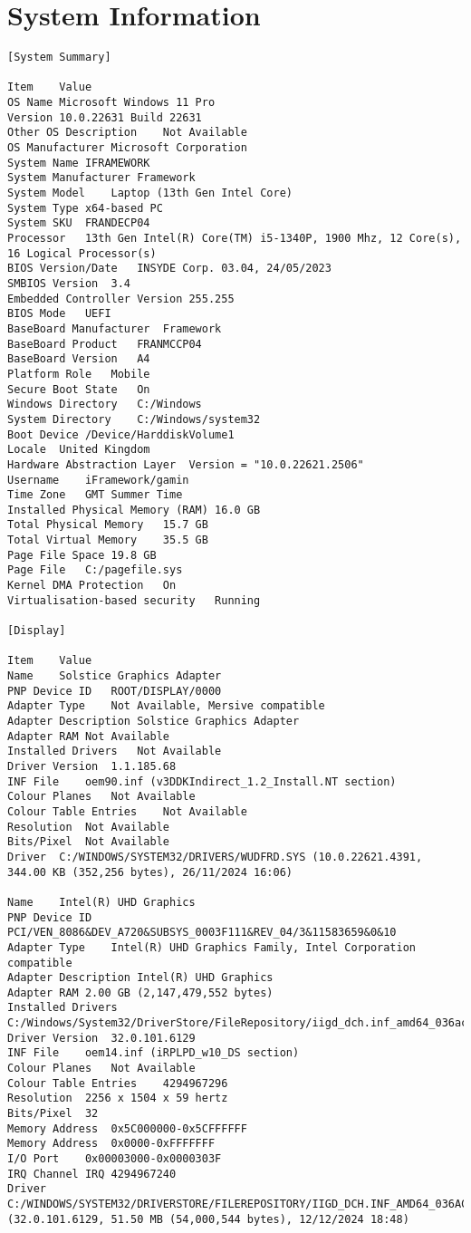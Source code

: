 \chapter{System Information}\label{app:sysinfo}
\begin{lstlisting}
[System Summary]

Item	Value	
OS Name	Microsoft Windows 11 Pro	
Version	10.0.22631 Build 22631	
Other OS Description 	Not Available	
OS Manufacturer	Microsoft Corporation	
System Name	IFRAMEWORK	
System Manufacturer	Framework	
System Model	Laptop (13th Gen Intel Core)	
System Type	x64-based PC	
System SKU	FRANDECP04	
Processor	13th Gen Intel(R) Core(TM) i5-1340P, 1900 Mhz, 12 Core(s), 16 Logical Processor(s)	
BIOS Version/Date	INSYDE Corp. 03.04, 24/05/2023	
SMBIOS Version	3.4	
Embedded Controller Version	255.255	
BIOS Mode	UEFI	
BaseBoard Manufacturer	Framework	
BaseBoard Product	FRANMCCP04	
BaseBoard Version	A4	
Platform Role	Mobile	
Secure Boot State	On	
Windows Directory	C:/Windows	
System Directory	C:/Windows/system32	
Boot Device	/Device/HarddiskVolume1	
Locale	United Kingdom	
Hardware Abstraction Layer	Version = "10.0.22621.2506"	
Username	iFramework/gamin	
Time Zone	GMT Summer Time	
Installed Physical Memory (RAM)	16.0 GB	
Total Physical Memory	15.7 GB	
Total Virtual Memory	35.5 GB	
Page File Space	19.8 GB	
Page File	C:/pagefile.sys	
Kernel DMA Protection	On	
Virtualisation-based security	Running	

[Display]

Item	Value	
Name	Solstice Graphics Adapter	
PNP Device ID	ROOT/DISPLAY/0000	
Adapter Type	Not Available, Mersive compatible	
Adapter Description	Solstice Graphics Adapter	
Adapter RAM	Not Available	
Installed Drivers	Not Available	
Driver Version	1.1.185.68	
INF File	oem90.inf (v3DDKIndirect_1.2_Install.NT section)	
Colour Planes	Not Available	
Colour Table Entries	Not Available	
Resolution	Not Available	
Bits/Pixel	Not Available	
Driver	C:/WINDOWS/SYSTEM32/DRIVERS/WUDFRD.SYS (10.0.22621.4391, 344.00 KB (352,256 bytes), 26/11/2024 16:06)	
		
Name	Intel(R) UHD Graphics	
PNP Device ID	PCI/VEN_8086&DEV_A720&SUBSYS_0003F111&REV_04/3&11583659&0&10	
Adapter Type	Intel(R) UHD Graphics Family, Intel Corporation compatible	
Adapter Description	Intel(R) UHD Graphics	
Adapter RAM	2.00 GB (2,147,479,552 bytes)	
Installed Drivers	C:/Windows/System32/DriverStore/FileRepository/iigd_dch.inf_amd64_036aca5c7729dd8d/igdumdim64.dll,C:/Windows/System32/DriverStore/FileRepository/iigd_dch.inf_amd64_036aca5c7729dd8d/igd10iumd64.dll,C:/Windows/System32/DriverStore/FileRepository/iigd_dch.inf_amd64_036aca5c7729dd8d/igd10iumd64.dll,C:/Windows/System32/DriverStore/FileRepository/iigd_dch.inf_amd64_036aca5c7729dd8d/igd12umd64.dll	
Driver Version	32.0.101.6129	
INF File	oem14.inf (iRPLPD_w10_DS section)	
Colour Planes	Not Available	
Colour Table Entries	4294967296	
Resolution	2256 x 1504 x 59 hertz	
Bits/Pixel	32	
Memory Address	0x5C000000-0x5CFFFFFF	
Memory Address	0x0000-0xFFFFFFF	
I/O Port	0x00003000-0x0000303F	
IRQ Channel	IRQ 4294967240	
Driver	C:/WINDOWS/SYSTEM32/DRIVERSTORE/FILEREPOSITORY/IIGD_DCH.INF_AMD64_036ACA5C7729DD8D/IGDKMDN64.SYS (32.0.101.6129, 51.50 MB (54,000,544 bytes), 12/12/2024 18:48)
\end{lstlisting}




